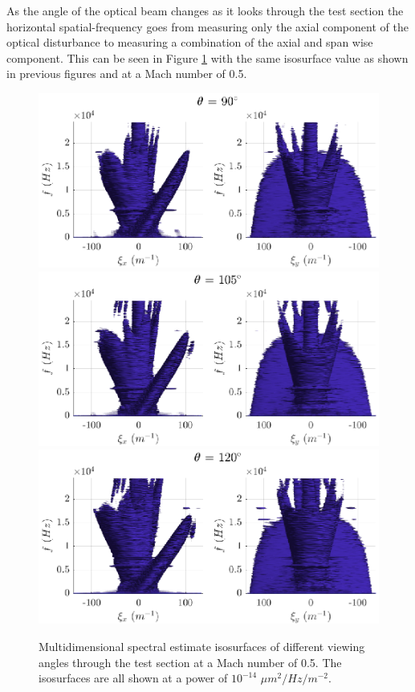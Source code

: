 As the angle of the optical beam changes as it looks through the test section the horizontal spatial-frequency goes from measuring only the axial component of the optical disturbance to measuring a combination of the axial and span wise component.
This can be seen in Figure \ref{fig:04_dispersion_angle} with the same isosurface value as shown in previous figures and at a Mach number of 0.5.
\begin{figure}
  \centering
  \includegraphics{../matlab/04_dispersion_analysis/dispersion_angle_90.eps}
  \includegraphics{../matlab/04_dispersion_analysis/dispersion_angle_105.eps}
  \includegraphics{../matlab/04_dispersion_analysis/dispersion_angle_120.eps}
  \caption{Multidimensional spectral estimate isosurfaces of different viewing angles through the test section at a Mach number of 0.5. The isosurfaces are all shown at a power of $10^{-14}$ $\mu m^2/Hz/m^{-2}$.}
  \label{fig:04_dispersion_angle}
\end{figure}

